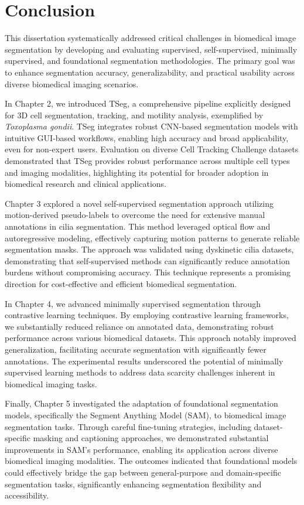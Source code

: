 \documentclass[./dissertation.tex]{subfiles}
\begin{document}
\chapter{Conclusion}
\label{ch:conclusion}

This dissertation systematically addressed critical challenges in biomedical image segmentation by developing and evaluating supervised, self-supervised, minimally supervised, and foundational segmentation methodologies. The primary goal was to enhance segmentation accuracy, generalizability, and practical usability across diverse biomedical imaging scenarios.

In Chapter 2, we introduced TSeg, a comprehensive pipeline explicitly designed for 3D cell segmentation, tracking, and motility analysis, exemplified by \textit{Toxoplasma gondii}. TSeg integrates robust CNN-based segmentation models with intuitive GUI-based workflows, enabling high accuracy and broad applicability, even for non-expert users. Evaluation on diverse Cell Tracking Challenge datasets demonstrated that TSeg provides robust performance across multiple cell types and imaging modalities, highlighting its potential for broader adoption in biomedical research and clinical applications.

Chapter 3 explored a novel self-supervised segmentation approach utilizing motion-derived pseudo-labels to overcome the need for extensive manual annotations in cilia segmentation. This method leveraged optical flow and autoregressive modeling, effectively capturing motion patterns to generate reliable segmentation masks. The approach was validated using dyskinetic cilia datasets, demonstrating that self-supervised methods can significantly reduce annotation burdens without compromising accuracy. This technique represents a promising direction for cost-effective and efficient biomedical segmentation.

In Chapter 4, we advanced minimally supervised segmentation through contrastive learning techniques. By employing contrastive learning frameworks, we substantially reduced reliance on annotated data, demonstrating robust performance across various biomedical datasets. This approach notably improved generalization, facilitating accurate segmentation with significantly fewer annotations. The experimental results underscored the potential of minimally supervised learning methods to address data scarcity challenges inherent in biomedical imaging tasks.

Finally, Chapter 5 investigated the adaptation of foundational segmentation models, specifically the Segment Anything Model (SAM), to biomedical image segmentation tasks. Through careful fine-tuning strategies, including dataset-specific masking and captioning approaches, we demonstrated substantial improvements in SAM's performance, enabling its application across diverse biomedical imaging modalities. The outcomes indicated that foundational models could effectively bridge the gap between general-purpose and domain-specific segmentation tasks, significantly enhancing segmentation flexibility and accessibility.
\end{document}

